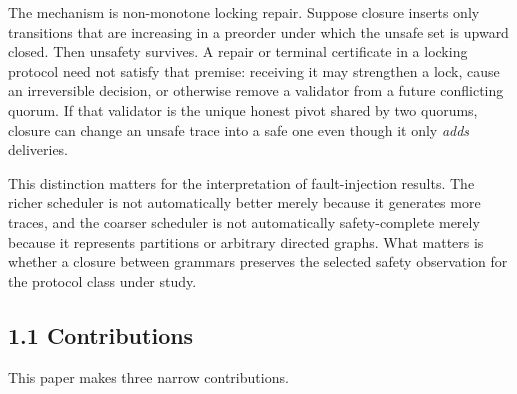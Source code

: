 \documentclass[10pt,a4paper]{article}
\begin{document}
The mechanism is non-monotone locking repair. Suppose closure inserts
only transitions that are increasing in a preorder under which the
unsafe set is upward closed. Then unsafety survives. A repair or
terminal certificate in a locking protocol need not satisfy that
premise: receiving it may strengthen a lock, cause an irreversible
decision, or otherwise remove a validator from a future conflicting
quorum. If that validator is the unique honest pivot shared by two
quorums, closure can change an unsafe trace into a safe one even though
it only \emph{adds} deliveries.

This distinction matters for the interpretation of fault-injection
results. The richer scheduler is not automatically better merely because
it generates more traces, and the coarser scheduler is not automatically
safety-complete merely because it represents partitions or arbitrary
directed graphs. What matters is whether a closure between grammars
preserves the selected safety observation for the protocol class under
study.

\subsection{1.1 Contributions}\label{contributions}

This paper makes three narrow contributions.
\end{document}
